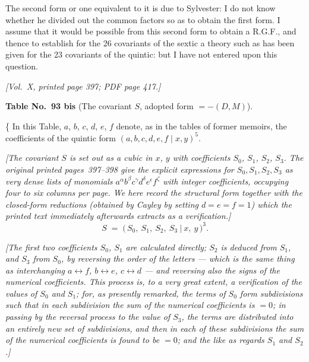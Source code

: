 \documentclass[11pt]{article}
\begin{document}
The second form or one equivalent to it is due to Sylvester: I do not know whether he divided out the common factors so as to obtain the first form. I assume that it would be possible from this second form to obtain a R.G.F., and thence to establish for the 26 covariants of the sextic a theory such as has been given for the 23 covariants of the quintic: but I have not entered upon this question.

\newpage

\noindent\textit{[Vol.~X, printed page 397; PDF page 417.]}

\begin{center}
\textbf{Table No.~93 bis} (The covariant $S$, adopted form $=-(D,M)$).
\end{center}

\medskip

\noindent\{ In this Table, $a$, $b$, $c$, $d$, $e$, $f$ denote, as in the tables of former memoirs, the coefficients of the quintic form $(a, b, c, d, e, f \mid x, y)^{5}$.

\medskip

\noindent\textit{[The covariant $S$ is set out as a cubic in $x$, $y$ with coefficients $S_{0}$, $S_{1}$, $S_{2}$, $S_{3}$. The original printed pages~397--398 give the explicit expressions for $S_{0}, S_{1}, S_{2}, S_{3}$ as very dense lists of monomials $a^{\alpha}b^{\beta}c^{\gamma}d^{\delta}e^{\epsilon}f^{\zeta}$ with integer coefficients, occupying four to six columns per page. We here record the structural form together with the closed-form reductions (obtained by Cayley by setting $d=e=f=1$) which the printed text immediately afterwards extracts as a verification.]}
\[
S \;=\; \bigl(\,S_{0},\ S_{1},\ S_{2},\ S_{3}\ \big\vert\ x,\ y\,\bigr)^{3}.
\]

\bigskip

\noindent\textit{[The first two coefficients $S_{0}$, $S_{1}$ are calculated directly; $S_{2}$ is deduced from $S_{1}$, and $S_{3}$ from $S_{0}$, by reversing the order of the letters --- which is the same thing as interchanging $a\leftrightarrow f$, $b\leftrightarrow e$, $c\leftrightarrow d$ --- and reversing also the signs of the numerical coefficients. This process is, to a very great extent, a verification of the values of $S_{0}$ and $S_{1}$; for, as presently remarked, the terms of $S_{0}$ form subdivisions such that in each subdivision the sum of the numerical coefficients is $=0$; in passing by the reversal process to the value of $S_{3}$, the terms are distributed into an entirely new set of subdivisions, and then in each of these subdivisions the sum of the numerical coefficients is found to be $=0$; and the like as regards $S_{1}$ and $S_{2}$.]}
\end{document}

